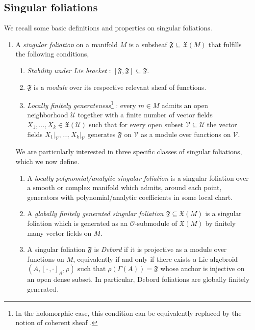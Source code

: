 \documentclass[10pt]{article}
\theoremstyle{plain}
\theoremstyle{definition}
\theoremstyle{remark}
\newcommand{\lb}{\left[ \cdot\,,\cdot\right] }
\begin{document}
\subsection{Singular foliations}\label{def}We recall some basic definitions and properties on singular foliations. 
\begin{enumerate}

    \item A \emph{singular foliation} on a manifold $M$
    is a subsheaf $\mathfrak{F}\subseteq\mathfrak{X}(M)$  that fulfills the following conditions,
\begin{enumerate}
     \item \emph{Stability under Lie bracket} : $[\mathfrak{F},\mathfrak{F}]\subseteq \mathfrak{F}$.
     \item $\mathfrak F$ is a \emph{module} over its respective relevant sheaf of functions.
     \item \emph{Locally finitely generateness}\footnote{In the holomorphic case, this condition can be equivalently replaced by the notion of coherent sheaf \cite{zbMATH03423310,Ali-Sinan}.} : every $m\in M$ admits an
open neighborhood $\mathcal{U}$ together with a finite number of vector fields  $X_1, \ldots, X_k \in \mathfrak{X}(\mathcal U)$ such that for
every open subset $\mathcal{V}\subseteq \mathcal U$ the vector fields ${X_1}{|_\mathcal{V}},\ldots, {X_k}{|_\mathcal{V}}$ generates $\mathfrak{F}$ on $\mathcal{V}$ as a module over functions on $\mathcal V$. 
\end{enumerate}

We are particularly interested in three specific classes of singular foliations, which we  now define.

 \begin{enumerate}
     \item[-] A \emph{locally polynomial/analytic singular foliation} is a singular foliation over a smooth or complex manifold which admits, around each point, generators with polynomial/analytic coefficients  in some local chart.

     \item[-] A \emph{globally finitely generated singular foliation $\mathfrak F\subseteq \mathfrak X(M)$} is  a singular foliation which is generated as an $\mathcal{O}$-submodule of $\mathfrak X(M)$ by finitely many vector fields on $M$.
\item[-] 
    A singular foliation $\mathfrak F$ is \emph{Debord} if it is projective as a module over functions on $M$, equivalently  if and only if there exists a Lie algebroid $(A, \lb_A, \rho)$ such that $\rho(\Gamma(A))=\mathfrak F$ whose anchor is injective on an open dense subset.  In particular, Debord foliations are globally  finitely generated.
    

\end{enumerate}
\end{enumerate}
\end{document}
